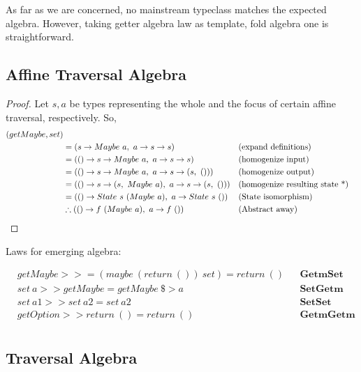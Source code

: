 \documentclass[a4paper]{article}
\begin{document}
As far as we are concerned, no mainstream typeclass matches the expected
algebra. However, taking getter algebra law as template, fold algebra one is
straightforward.

\subsection{Affine Traversal Algebra}

\begin{proof}
  Let $s, a$ be types representing the whole and the focus of certain affine traversal, respectively. So,
  \begin{align*}
    (getMaybe, set) \\
    &= (s \rightarrow Maybe\ a,\ a \rightarrow s \rightarrow s) &&\text{(expand definitions)} \\
    &= (() \rightarrow s \rightarrow Maybe\ a,\ a \rightarrow s \rightarrow s) &&\text{(homogenize input)} \\
    &= (() \rightarrow s \rightarrow Maybe\ a,\ a \rightarrow s \rightarrow (s,\ ())) &&\text{(homogenize output)} \\
    &= (() \rightarrow s \rightarrow (s,\ Maybe\ a),\ a \rightarrow s \rightarrow (s,\ ())) &&\text{(homogenize resulting state *)} \\
    &= (() \rightarrow State\ s\ (Maybe\ a),\ a \rightarrow State\ s\ ()) &&\text{(State isomorphism)} \\
    &\therefore (() \rightarrow f\ (Maybe\ a),\ a \rightarrow f\ ()) &&\text{(Abstract away)}\qedhere
  \end{align*}
\end{proof}

Laws for emerging algebra:

\begin{align*}
  & getMaybe >>= (maybe\ (return\ ())\ set) = return\ () &&\textbf{GetmSet} \\
  & set\ a >> getMaybe = getMaybe\ \$> a &&\textbf{SetGetm} \\
  & set\ a1 >> set\ a2 = set\ a2 &&\textbf{SetSet} \\
  & getOption >> return\ () = return\ () &&\textbf{GetmGetm} \\
\end{align*}

\subsection{Traversal Algebra}
\end{document}
